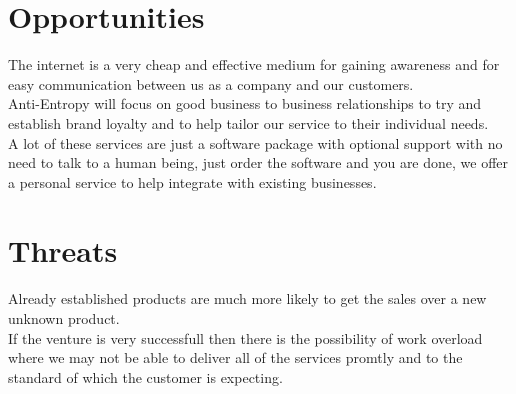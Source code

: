 \documentclass{article}
\begin{document}
\section{Opportunities}
The internet is a very cheap and effective medium for gaining awareness and for easy communication between us as a company and our customers.
\\Anti-Entropy will focus on good business to business relationships to try and establish brand loyalty and to help tailor our service to their individual needs.
\\A lot of these services are just a software package with optional support with no need to talk to a human being, just order the software and you are done, we offer a personal service to help integrate with existing businesses.

\section{Threats}
Already established products are much more likely to get the sales over a new unknown product.
\\If the venture is very successfull then there is the possibility of work overload where we may not be able to deliver all of the services promtly and to the standard of which the customer is expecting.
\end{document}
